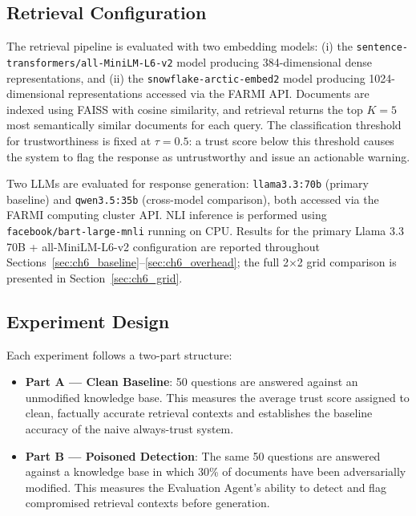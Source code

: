 \subsection{Retrieval Configuration}

The retrieval pipeline is evaluated with two embedding models: (i) the
\texttt{sentence-transformers/all-MiniLM-L6-v2} model producing 384-dimensional dense
representations, and (ii) the \texttt{snowflake-arctic-embed2} model producing
1024-dimensional representations accessed via the FARMI API. Documents are indexed using
FAISS with cosine similarity, and retrieval returns the top $K=5$ most semantically similar
documents for each query. The classification threshold for trustworthiness is fixed at
$\tau = 0.5$: a trust score below this threshold causes the system to flag the response as
untrustworthy and issue an actionable warning.

Two LLMs are evaluated for response generation: \texttt{llama3.3:70b} (primary baseline)
and \texttt{qwen3.5:35b} (cross-model comparison), both accessed via the FARMI computing
cluster API. NLI inference is performed using \texttt{facebook/bart-large-mnli} running on
CPU. Results for the primary Llama 3.3 70B + all-MiniLM-L6-v2 configuration are reported
throughout Sections~\ref{sec:ch6_baseline}--\ref{sec:ch6_overhead}; the full 2×2 grid
comparison is presented in Section~\ref{sec:ch6_grid}.

\subsection{Experiment Design}

Each experiment follows a two-part structure:

\begin{itemize}
    \item \textbf{Part A --- Clean Baseline}: 50 questions are answered against an unmodified
    knowledge base. This measures the average trust score assigned to clean, factually accurate
    retrieval contexts and establishes the baseline accuracy of the naive always-trust system.

    \item \textbf{Part B --- Poisoned Detection}: The same 50 questions are answered against a
    knowledge base in which 30\% of documents have been adversarially modified. This measures
    the Evaluation Agent's ability to detect and flag compromised retrieval contexts before
    generation.
\end{itemize}

